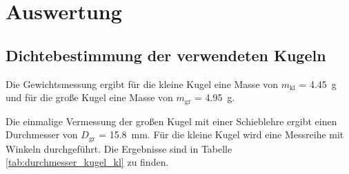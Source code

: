 
\section{Auswertung}
\subsection{Dichtebestimmung der verwendeten Kugeln}
Die Gewichtsmessung ergibt für die kleine Kugel eine Masse von
$m_\text{kl}$ = \SI{4.45}{\gram} und für die große Kugel eine Masse von
$m_\text{gr}$ = \SI{4.95}{\gram}.

Die einmalige Vermessung der großen Kugel mit einer Schieblehre ergibt
einen Durchmesser von $D_\text{gr}$ = \SI{15.8}{\milli\metre}. Für die kleine
Kugel wird eine Messreihe mit Winkeln durchgeführt. Die Ergebnisse sind
in Tabelle \ref{tab:durchmesser_kugel_kl} zu finden.

